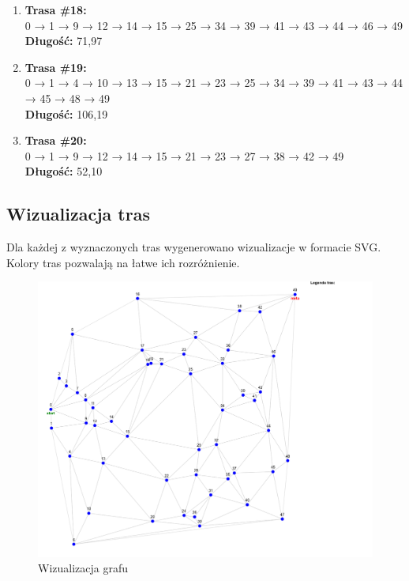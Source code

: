 \documentclass{article}
\begin{document}
\begin{enumerate}
    \item \textbf{Trasa \#18:}\\
    0 → 1 → 9 → 12 → 14 → 15 → 25 → 34 → 39 → 41 → 43 → 44 → 46 → 49\\
    \textbf{Długość:} 71{,}97

    \item \textbf{Trasa \#19:}\\
    0 → 1 → 4 → 10 → 13 → 15 → 21 → 23 → 25 → 34 → 39 → 41 → 43 → 44 → 45 → 48 → 49\\
    \textbf{Długość:} 106{,}19

    \item \textbf{Trasa \#20:}\\
    0 → 1 → 9 → 12 → 14 → 15 → 21 → 23 → 27 → 38 → 42 → 49\\
    \textbf{Długość:} 52{,}10
\end{enumerate}


\subsection*{Wizualizacja tras}

Dla każdej z wyznaczonych tras wygenerowano wizualizacje w formacie SVG. Kolory tras pozwalają na łatwe ich rozróżnienie.

\begin{figure}[H]
    \centering
    \includegraphics[width=1\linewidth]{clear.png}
    \caption{Wizualizacja grafu}
    \label{fig:enter-label}
\end{figure}
\end{document}
